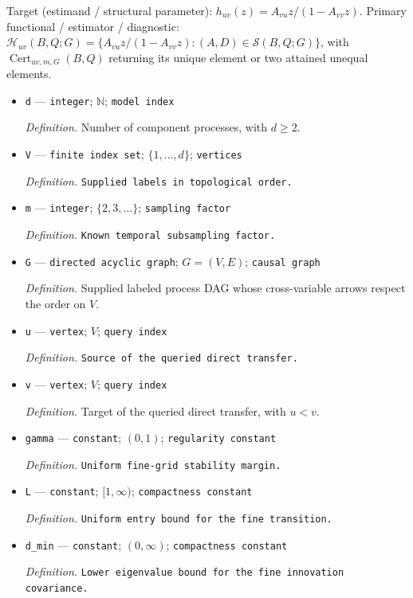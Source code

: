 \documentclass{article}
\begin{document}
Target (estimand / structural parameter): \(h_{uv}(z)=A_{vu}z/(1-A_{vv}z)\).
Primary functional / estimator / diagnostic: \(\mathcal H_{uv}(B,Q;G)=\{A_{vu}z/(1-A_{vv}z):(A,D)\in\mathcal S(B,Q;G)\}\), with \(\operatorname{Cert}_{uv,m,G}(B,Q)\) returning its unique element or two attained unequal elements.
\begin{itemize}
  \item \texttt{d} --- \texttt{integer}; \(\mathbb N\); \texttt{model index}
  \par\smallskip\noindent\emph{Definition.} Number of component processes, with \(d\ge 2\).
  \item \texttt{V} --- \texttt{finite index set}; \(\{1,\ldots,d\}\); \texttt{vertices}
  \par\smallskip\noindent\emph{Definition.} \texttt{Supplied labels in topological order.}
  \item \texttt{m} --- \texttt{integer}; \(\{2,3,\ldots\}\); \texttt{sampling factor}
  \par\smallskip\noindent\emph{Definition.} \texttt{Known temporal subsampling factor.}
  \item \texttt{G} --- \texttt{directed acyclic graph}; \(G=(V,E)\); \texttt{causal graph}
  \par\smallskip\noindent\emph{Definition.} Supplied labeled process DAG whose cross-variable arrows respect the order on \(V\).
  \item \texttt{u} --- \texttt{vertex}; \(V\); \texttt{query index}
  \par\smallskip\noindent\emph{Definition.} \texttt{Source of the queried direct transfer.}
  \item \texttt{v} --- \texttt{vertex}; \(V\); \texttt{query index}
  \par\smallskip\noindent\emph{Definition.} Target of the queried direct transfer, with \(u<v\).
  \item \texttt{gamma} --- \texttt{constant}; \((0,1)\); \texttt{regularity constant}
  \par\smallskip\noindent\emph{Definition.} \texttt{Uniform fine-\allowbreak{}grid stability margin.}
  \item \texttt{L} --- \texttt{constant}; \([1,\infty)\); \texttt{compactness constant}
  \par\smallskip\noindent\emph{Definition.} \texttt{Uniform entry bound for the fine transition.}
  \item \texttt{d\_\allowbreak{}min} --- \texttt{constant}; \((0,\infty)\); \texttt{compactness constant}
  \par\smallskip\noindent\emph{Definition.} \texttt{Lower eigenvalue bound for the fine innovation covariance.}

\end{itemize}
\end{document}
